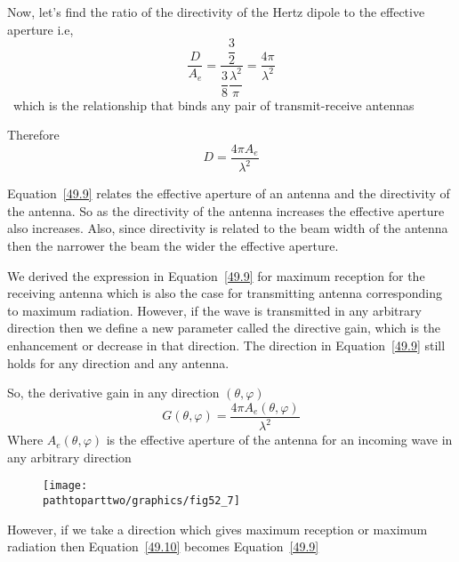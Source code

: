 Now, let's find the ratio  of the directivity of the Hertz dipole to the effective aperture i.e,
$$\dfrac{D}{A_{e}}=\dfrac{\dfrac{3}{2}}{\dfrac{3}{8}\dfrac{\lambda^{2}}{\pi}}= \dfrac{4\pi}{\lambda^{2}}$$ \ which is the relationship that binds any pair of transmit-receive antennas

Therefore
\begin{equation}
\label{49.9}
D=\dfrac{4\pi A_{e}}{\lambda^{2}}
\end{equation}

Equation~\ref{49.9} relates the effective aperture of an antenna and the directivity of the antenna. So as the directivity of the antenna increases the effective aperture also increases. Also, since directivity is related to the beam width of the antenna then the narrower the beam the wider the effective aperture.

We derived the expression in Equation~\ref{49.9} for maximum reception for the receiving antenna which is also the case for transmitting antenna corresponding to maximum radiation. However, if the wave is transmitted in any arbitrary direction then we define a new parameter called the directive gain, which is the enhancement or decrease in that direction. The direction in Equation~\ref{49.9} still holds for any direction and any antenna.

So, the derivative gain in any direction $(\theta, \varphi)$ 
\begin{equation}
\label{49.10}
G(\theta, \varphi)=\dfrac{4 \pi A_{e}(\theta, \varphi)}{\lambda^{2}}
\end{equation}
Where $A_{e}(\theta, \varphi)$ is the effective aperture of the antenna for an incoming wave in any arbitrary direction
\begin{figure}[h]
\centering
\texttt{[image: \\pathtoparttwo/graphics/fig52\_7]}
\caption{}
\label{fig 1}	
\end{figure}

However, if we take a direction which gives maximum reception or maximum radiation then Equation~\ref{49.10} becomes Equation~\ref{49.9}

